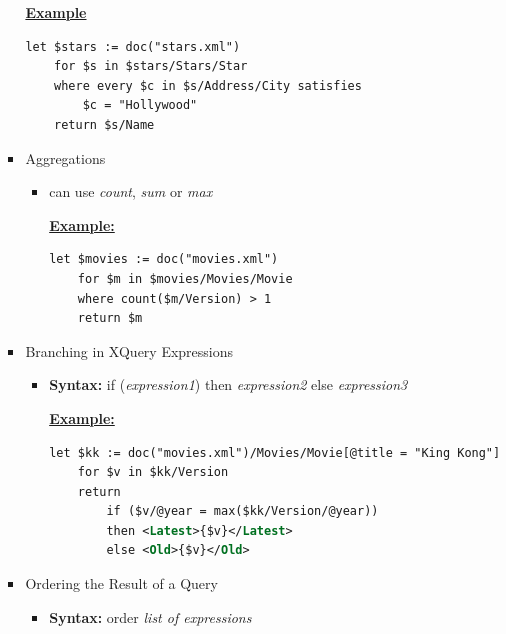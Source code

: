 \documentclass[12pt]{article}
\begin{document}
\begin{enumerate}[1.]
\begin{enumerate}[a)]
\begin{itemize}
            \bigskip

            \underline{\textbf{Example}}

    \begin{lstlisting}[language=XML]
    let $stars := doc("stars.xml")
    for $s in $stars/Stars/Star
    where every $c in $s/Address/City satisfies
        $c = "Hollywood"
    return $s/Name
    \end{lstlisting}

            \item Aggregations
            \begin{itemize}
                \item can use \textit{count}, \textit{sum} or \textit{max}

                \bigskip

                \underline{\textbf{Example:}}

    \begin{lstlisting}[language=XML]
    let $movies := doc("movies.xml")
    for $m in $movies/Movies/Movie
    where count($m/Version) > 1
    return $m

    \end{lstlisting}
            \end{itemize}

            \item Branching in XQuery Expressions
            \begin{itemize}
                \item \textbf{Syntax:} if (\textit{expression1}) then \textit{expression2} else \textit{expression3}

                \bigskip

                \underline{\textbf{Example:}}

    \begin{lstlisting}[language=XML]
    let $kk := doc("movies.xml")/Movies/Movie[@title = "King Kong"]
    for $v in $kk/Version
    return
        if ($v/@year = max($kk/Version/@year))
        then <Latest>{$v}</Latest>
        else <Old>{$v}</Old>
    \end{lstlisting}
            \end{itemize}


            \item Ordering the Result of a Query
            \begin{itemize}
                \item \textbf{Syntax:} order \textit{list of expressions}


\end{itemize}
\end{itemize}
\end{enumerate}
\end{enumerate}
\end{document}
